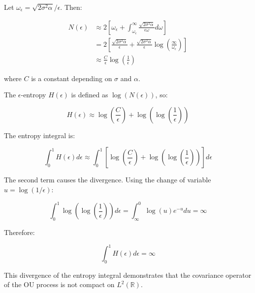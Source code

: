 \documentclass{article}
\begin{document}
Let $\omega_\epsilon = \sqrt{2\sigma^2\alpha}/\epsilon$. Then:

\begin{align*}
N(\epsilon) &\approx 2\left[\omega_\epsilon + \int_{\omega_\epsilon}^{\infty} \frac{\sqrt{2\sigma^2\alpha}}{\epsilon\omega} d\omega\right] \\
&= 2\left[\frac{\sqrt{2\sigma^2\alpha}}{\epsilon} + \frac{\sqrt{2\sigma^2\alpha}}{\epsilon} \log\left(\frac{\infty}{\omega_\epsilon}\right)\right] \\
&\approx \frac{C}{\epsilon} \log\left(\frac{1}{\epsilon}\right)
\end{align*}

where $C$ is a constant depending on $\sigma$ and $\alpha$.

The $\epsilon$-entropy $H(\epsilon)$ is defined as $\log(N(\epsilon))$, so:

\[ H(\epsilon) \approx \log\left(\frac{C}{\epsilon}\right) + \log\left(\log\left(\frac{1}{\epsilon}\right)\right) \]

The entropy integral is:

\[ \int_0^1 H(\epsilon) d\epsilon \approx \int_0^1 \left[\log\left(\frac{C}{\epsilon}\right) + \log\left(\log\left(\frac{1}{\epsilon}\right)\right)\right] d\epsilon \]

The second term causes the divergence. Using the change of variable $u = \log(1/\epsilon)$:

\[ \int_0^1 \log\left(\log\left(\frac{1}{\epsilon}\right)\right) d\epsilon = \int_{\infty}^0 \log(u) e^{-u} du = \infty \]

Therefore:

\[ \int_0^1 H(\epsilon) d\epsilon = \infty \]

This divergence of the entropy integral demonstrates that the covariance operator of the OU process is not compact on $L^2(\mathbb{R})$.
\end{document}
